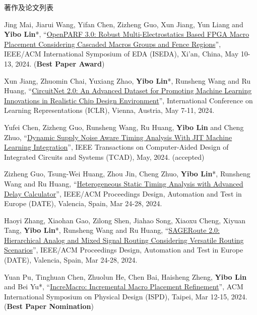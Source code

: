 \begin{rSection}{著作及论文列表}
\begin{description}[font=\normalfont, rightmargin=2em]
\item[{[C145]}]{
        Jing Mai, Jiarui Wang, Yifan Chen, Zizheng Guo, Xun Jiang, Yun Liang and \textbf{Yibo Lin}*, 
    ``\href{https://doi.org/10.1109/ISEDA62518.2024.10617535}{OpenPARF 3.0: Robust Multi-Electrostatics Based FPGA Macro Placement Considering Cascaded Macros Groups and Fence Regions}'', 
    IEEE/ACM International Symposium of EDA (ISEDA), Xi'an, China, May 10-13, 2024.
    (\textbf{Best Paper Award})
}
            

\item[{[C144]}]{
        Xun Jiang, Zhuomin Chai, Yuxiang Zhao, \textbf{Yibo Lin}*, Runsheng Wang and Ru Huang, 
    ``\href{https://openreview.net/pdf?id=nMFSUjxMIl}{CircuitNet 2.0: An Advanced Dataset for Promoting Machine Learning Innovations in Realistic Chip Design Environment}'', 
    International Conference on Learning Representations (ICLR), Vienna, Austria, May 7-11, 2024.
    
}
            

\item[{[J143]}]{
        Yufei Chen, Zizheng Guo, Runsheng Wang, Ru Huang, \textbf{Yibo Lin} and Cheng Zhuo, 
    ``\href{https://doi.org/10.1109/TCAD.2023.3342603}{Dynamic Supply Noise Aware Timing Analysis With JIT Machine Learning Integration}'', 
    IEEE Transactions on Computer-Aided Design of Integrated Circuits and Systems (TCAD), May, 2024.
    (accepted)
}
            

\item[{[C142]}]{
        Zizheng Guo, Tsung-Wei Huang, Zhou Jin, Cheng Zhuo, \textbf{Yibo Lin}*, Runsheng Wang and Ru Huang, 
    ``\href{https://ieeexplore.ieee.org/document/10546507}{Heterogeneous Static Timing Analysis with Advanced Delay Calculator}'', 
    IEEE/ACM Proceedings Design, Automation and Test in Europe (DATE), Valencia, Spain, Mar 24-28, 2024.
    
}
            

\item[{[C141]}]{
        Haoyi Zhang, Xiaohan Gao, Zilong Shen, Jiahao Song, Xiaoxu Cheng, Xiyuan Tang, \textbf{Yibo Lin}*, Runsheng Wang and Ru Huang, 
    ``\href{https://ieeexplore.ieee.org/document/10546542}{SAGERoute 2.0: Hierarchical Analog and Mixed Signal Routing Considering Versatile Routing Scenarios}'', 
    IEEE/ACM Proceedings Design, Automation and Test in Europe (DATE), Valencia, Spain, Mar 24-28, 2024.
    
}
            

\item[{[C140]}]{
        Yuan Pu, Tinghuan Chen, Zhuolun He, Chen Bai, Haisheng Zheng, \textbf{Yibo Lin} and Bei Yu*, 
    ``\href{https://doi.org/10.1145/3626184.3633321}{IncreMacro: Incremental Macro Placement Refinement}'', 
    ACM International Symposium on Physical Design (ISPD), Taipei, Mar 12-15, 2024.
    (\textbf{Best Paper Nomination})
}
            


\end{description}
\end{rSection}
